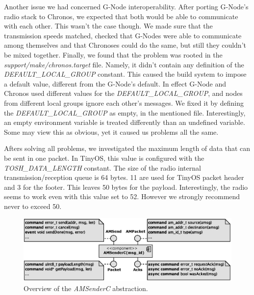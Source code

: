 Another issue we had concerned G-Node interoperability. After porting G-Node's radio stack to Chronos, we expected that both would be able to communicate with each other. This wasn't the case though. We made sure that the transmission speeds matched, checked that G-Nodes were able to communicate among themselves and that Chronoses could do the same, but still they couldn't be mixed together. Finally, we found that the problem was rooted in the \emph{support/make/chronos.target} file. Namely, it didn't contain any definition of the \emph{DEFAULT\_LOCAL\_GROUP} constant. This caused the build system to impose a default value, different from the G-Node's default. In effect G-Node and Chronos used different values for the \emph{DEFAULT\_LOCAL\_GROUP}, and nodes from different local groups ignore each other's messages. We fixed it by defining the \emph{DEFAULT\_LOCAL\_GROUP} as empty, in the mentioned file. Interestingly, an empty environment variable is treated differently than an undefined variable. Some may view this as obvious, yet it caused us problems all the same.

Afters solving all problems, we investigated the maximum length of data that can be sent in one packet. In TinyOS, this value is configured with the \emph{TOSH\_DATA\_LENGTH} constant. The size of the radio internal transmission/reception queue is 64 bytes. 11 are used for TinyOS packet header and 3 for the footer. This leaves 50 bytes for the payload. Interestingly, the radio seems to work even with this value set to 52. However we strongly recommend never to exceed 50.

\begin{figure}[h]
  \centering
  \includegraphics[width=1.0\textwidth]{diagrams/am_sender_c.eps}
  \caption{Overview of the \emph{AMSenderC} abstraction.}
  \label{fig:am_sender_c}
\end{figure}

